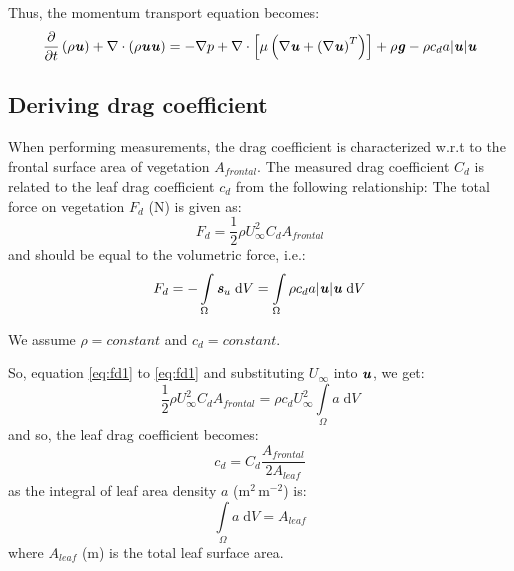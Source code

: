 Thus, the momentum transport equation becomes:
\begin{equation}
\frac{\partial}{\partial t} \left(\rho \textbf{\textit{u}} \right) + \nabla \cdot \left(\rho \textbf{\textit{u}}\textbf{\textit{u}} \right) = - \nabla p + \nabla \cdot \left[ \mu \left( \nabla \textbf{\textit{u}} + \left(\nabla \textbf{\textit{u}} \right)^T \right) \right] + \rho \textbf{\textit{g}} - \rho c_d a |\textbf{\textit{u}}| \textbf{\textit{u}}
\end{equation}


\subsection{Deriving drag coefficient}

When performing measurements, the drag coefficient is characterized w.r.t to the frontal surface area of vegetation $A_{\textit{frontal}}$. The measured drag coefficient $C_d$ is related to the leaf drag coefficient $c_d$ from the following relationship: 
The total force on vegetation $F_d$ (N) is given as:	 
\begin{equation}
F_d = \frac{1}{2}{\rho}U_\infty ^2{C_d}{A_{\textit{frontal}}}
\label{eq:fd1}
\end{equation}
and should be equal to the volumetric force, i.e.:
\begin{equation}
F_d = - \mathop \int\limits_\Omega \textbf{\textit{s}}_u\;\mathrm{d}V = \mathop \int \limits_\Omega  {\rho}{c_d}{a} |\textbf{\textit{u}}|\textbf{\textit{u}}\;\mathrm{d}V
\label{eq:fd2}
\end{equation}

\begin{assumption}
We assume $\rho = \textit{constant}$ and $c_d = \textit{constant}$.
\end{assumption}
So, equation \cref{eq:fd1} to \cref{eq:fd1} and substituting $U_\infty$ into $\textbf{\textit{u}}$, we get:
\begin{equation}
\frac{1}{2}{\rho}U_\infty ^2{C_d}{A_{\textit{frontal}}} = {\rho}{c_d} U_\infty ^2 \mathop \int \limits_\Omega {a}  \;\mathrm{d}V
\label{eq:fd3}
\end{equation}
and so, the leaf drag coefficient becomes:
\begin{equation}
c_d = C_d\frac{A_{\textit{frontal}}}{2A_{\textit{leaf}}}
\end{equation}
as the integral of leaf area density $a$ (m$^{2}$\,m$^{-2}$) is:
\begin{equation}
\mathop \int\limits_\Omega a\;\mathrm{d}V = A_{\textit{leaf}}
\end{equation}
where $A_{\textit{leaf}}$ (m) is the total leaf surface area.


